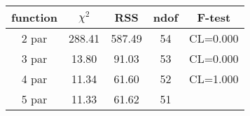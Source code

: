 \begin{tabular}{c|c|c|c|c}
function & $\chi^2$ & RSS & ndof & F-test \\
\hline
2 par & 288.41 & 587.49 & 54 & CL=0.000 \\
3 par & 13.80 & 91.03 & 53 & CL=0.000 \\
4 par & 11.34 & 61.60 & 52 & CL=1.000 \\
5 par & 11.33 & 61.62 & 51 & \\
\hline
\end{tabular}
